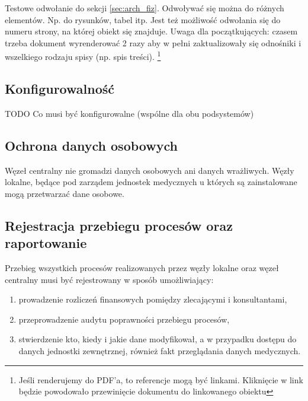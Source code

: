 \documentclass[a4paper]{article}
\begin{document}
Testowe odwołanie do sekcji \ref{sec:arch_fiz}. Odwoływać się można do różnych elementów. Np. do rysunków, tabel itp. Jest też możliwość odwołania się do numeru strony, na której obiekt się znajduje. Uwaga dla początkujących: czasem trzeba dokument wyrenderować 2 razy aby w pełni zaktualizowały się odnośniki i wszelkiego rodzaju spisy (np. spis treści).
\footnote{Jeśli renderujemy do PDF'a, to referencje mogą być linkami. Kliknięcie w link będzie powodowało przewinięcie dokumentu do linkowanego obiektu}

\subsection{Konfigurowalność}

TODO Co musi być konfigurowalne (wspólne dla obu podsystemów)

\subsection{Ochrona danych osobowych}

Węzeł centralny nie gromadzi danych osobowych ani danych wrażliwych. Węzły lokalne, będące pod zarządem jednostek medycznych u których są zainstalowane mogą przetwarzać dane osobowe.

\subsection{Rejestracja przebiegu procesów oraz raportowanie}

Przebieg wszystkich procesów realizowanych przez węzły lokalne oraz węzeł 
centralny musi być rejestrowany w sposób umożliwiający: 
\begin{enumerate}
  \item prowadzenie rozliczeń finansowych pomiędzy zlecającymi i konsultantami,
  \item przeprowadzenie audytu poprawności przebiegu procesów,
  \item stwierdzenie kto, kiedy i jakie dane modyfikował, a w przypadku dostępu do danych jednostki zewnętrznej, również fakt przeglądania danych medycznych.
\end{enumerate}

\end{document}
